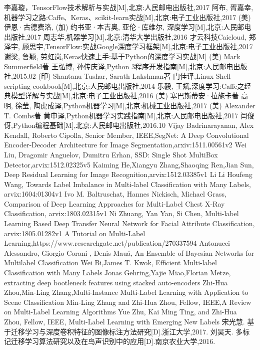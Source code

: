 \documentclass[openright,oneside]{ctexbook}	%
\begin{document}
\begin{thebibliography}{99}
 李嘉璇，TensorFlow技术解析与实战[M],北京:人民邮电出版社,2017
 阿布, 胥嘉幸,机器学习之路:Caffe、Keras、scikit-learn实战[M],北京:电子工业出版社,2017
 (美) 伊恩·古德费洛, (加) 约书亚·本吉奥, 亚伦·库维尔, 深度学习[M],北京:人民邮电出版社,2017 
 周志华,机器学习[M],北京:清华大学出版社,2016
 才云科技Caicloud, 郑泽宇, 顾思宇,TensorFlow:实战Google深度学习框架[M],北京:电子工业出版社,2017
 谢梁, 鲁颖, 劳虹岚,Keras快速上手:基于Python的深度学习实战[M]
 (美) Mark Summerfield著 王弘博, 孙传庆译,Python 3程序开发指南[M],北京:人民邮电出版社,2015.02
 (印) Shantanu Tushar, Sarath Lakshman著 门佳译,Linux Shell scripting cookbook[M],北京:人民邮电出版社,2014
 乐毅, 王斌,深度学习:Caffe之经典模型详解与实战[M],北京:电子工业出版社,2016
(美) 塞巴斯蒂安·拉施卡著 高明, 徐莹, 陶虎成译,Python机器学习[M],北京:机械工业出版社,2017
(美) Alexander T. Combs著 黄申译,Python机器学习实践指南[M],北京:人民邮电出版社,2017
闫俊伢,Python编程基础[M],北京:人民邮电出版社,2016.10
Vijay Badrinarayanan, Alex Kendall, Roberto Cipolla, Senior Member, IEEE,SegNet: A Deep Convolutional Encoder-Decoder 
Architecture for Image Segmentation,arxiv:1511.00561v2
Wei Liu, Dragomir Anguelov, Dumitru Erhan, 
SSD: Single Shot MultiBox Detector,arvix:1512.02325v5
Kaiming He,Xiangyu Zhang,Shaoqing Ren,Jian Sun,
Deep Residual Learning for Image Recognition,arvix:1512.03385v1
Li Li Houfeng Wang,
Towards Label Imbalance in Multi-label Classification with Many Labels,
arvix:1604:01304v1
Ivo M. Baltruschat, Hannes Nickisch, Michael Grass,
Comparison of Deep Learning Approaches for
Multi-Label Chest X-Ray Classification,
arvix:1803.02315v1
Ni Zhuang, Yan Yan, Si Chen,
Multi-label Learning Based Deep Transfer Neural Network for Facial Attribute
Classification,
arvix:1805.01282v1
A Tutorial on Multi-Label Learning,https://www.researchgate.net/publication/270337594
Antonucci Alessandro, Giorgio Corani , Denis Mauá,
An Ensemble of Bayesian Networks for Multilabel Classification 
Wei Bi,James T. Kwok,
Efficient Multi-label Classification with Many Labels
Jonas Gehring,Yajie Miao,Florian Metze,
extracting deep bootleneck features using stacked auto-encoders
Zhi-Hua Zhou,Min-Ling Zhang,Multi-Instance Multi-Label Learning with
Application to Scene Classification
Min-Ling Zhang and Zhi-Hua Zhou, Fellow, IEEE,A Review on Multi-Label Learning Algorithms
Yue Zhu, Kai Ming Ting, and Zhi-Hua Zhou, Fellow, IEEE,
Multi-Label Learning with Emerging New Labels
宋光慧. 基于迁移学习与深度卷积特征的图像标注方法研究[D].浙江大学,2017.
刘昊天. 多标记迁移学习算法研究以及在鸟声识别中的应用[D].南京农业大学,2016.
\end{thebibliography}
\end{document}
